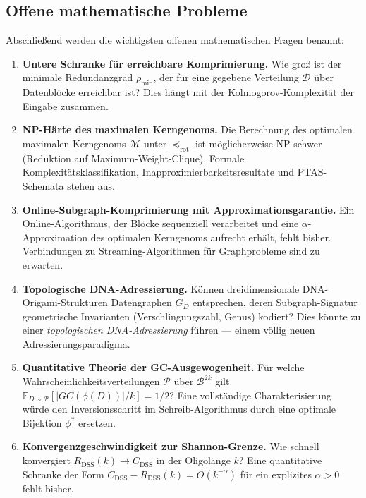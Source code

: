 ﻿\documentclass[a4paper,12pt]{article}
\theoremstyle{definition}
\theoremstyle{plain}
\begin{document}
\subsection{Offene mathematische Probleme}
\label{ssec:offene_probleme}

Abschließend werden die wichtigsten offenen mathematischen Fragen benannt:

\begin{enumerate}
  \item \textbf{Untere Schranke für erreichbare Komprimierung.}
        Wie groß ist der minimale Redundanzgrad $\rho_{\min}$, der für
        eine gegebene Verteilung $\mathcal{D}$ über Datenblöcke erreichbar
        ist?  Dies hängt mit der Kolmogorov-Komplexität der Eingabe
        zusammen.

  \item \textbf{NP-Härte des maximalen Kerngenoms.}
        Die Berechnung des optimalen maximalen Kerngenoms $\mathcal{M}$
        unter $\preceq_{\mathrm{rot}}$ ist möglicherweise NP-schwer
        (Reduktion auf Maximum-Weight-Clique).  Formale
        Komplexitätsklassifikation, Inapproximierbarkeitsresultate und
        PTAS-Schemata stehen aus.

  \item \textbf{Online-Subgraph-Komprimierung mit Approximationsgarantie.}
        Ein Online-Algorithmus, der Blöcke sequenziell verarbeitet und eine
        $\alpha$-Approximation des optimalen Kerngenoms aufrecht erhält,
        fehlt bisher.  Verbindungen zu Streaming-Algorithmen für
        Graphprobleme sind zu erwarten.

  \item \textbf{Topologische DNA-Adressierung.}
        Können dreidimensionale DNA-Origami-Struk\-turen Datengraphen $G_D$
        entsprechen, deren Subgraph-Signatur geometrische Invarianten
        (Verschlingungszahl, Genus) kodiert?  Dies könnte zu einer
        \emph{topologischen DNA-Adressierung} führen --- einem
        völlig neuen Adressierungsparadigma.

  \item \textbf{Quantitative Theorie der GC-Ausgewogenheit.}
        Für welche Wahrscheinlichkeitsverteilungen $\mathcal{P}$ über
        $\mathcal{B}^{2k}$ gilt
        $\mathbb{E}_{D \sim \mathcal{P}}[|GC(\phi(D))|/k] = 1/2$?
        Eine vollständige Charakterisierung würde den Inversionsschritt
        im Schreib-Algorithmus durch eine optimale Bijektion $\phi^*$
        ersetzen.

  \item \textbf{Konvergenzgeschwindigkeit zur Shannon-Grenze.}
        Wie schnell konvergiert $R_{\mathrm{DSS}}(k) \to C_{\mathrm{DSS}}$
        in der Oligolänge $k$?  Eine quantitative Schranke der Form
        $C_{\mathrm{DSS}} - R_{\mathrm{DSS}}(k) = O(k^{-\alpha})$ für
        ein explizites $\alpha > 0$ fehlt bisher.


\end{enumerate}
\end{document}
